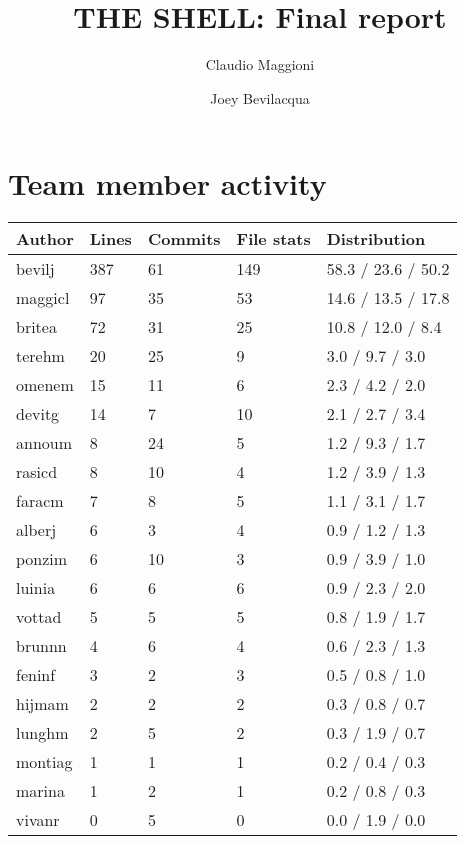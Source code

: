 \documentclass[hidelinks,12pt,a4paper,numbers=enddot]{scrartcl}
\title{THE SHELL: Final report}
\author{Claudio Maggioni \and Joey Bevilacqua}
\begin{document}
\maketitle
\tableofcontents
\newpage

\section{Team member activity}

\begin{table}[h]
\centering
\begin{tabular}{lllll}
\textbf{Author} & \textbf{Lines} & \textbf{Commits} & \textbf{File stats} & \textbf{Distribution} \\ \hline
bevilj  & 387 &   61 &  149 & 58.3 / 23.6 / 50.2  \\
maggicl &  97 &   35 &   53 & 14.6 / 13.5 / 17.8  \\
britea  &  72 &   31 &   25 & 10.8 / 12.0 / 8.4  \\
terehm  &  20 &   25 &    9 &  3.0 / 9.7 / 3.0  \\
omenem  &  15 &   11 &    6 &  2.3 / 4.2 / 2.0  \\
devitg  &  14 &    7 &   10 &  2.1 / 2.7 / 3.4  \\
annoum  &   8 &   24 &    5 &  1.2 / 9.3 / 1.7  \\
rasicd  &   8 &   10 &    4 &  1.2 / 3.9 / 1.3  \\
faracm  &   7 &    8 &    5 &  1.1 / 3.1 / 1.7  \\
alberj  &   6 &    3 &    4 &  0.9 / 1.2 / 1.3  \\
ponzim  &   6 &   10 &    3 &  0.9 / 3.9 / 1.0  \\
luinia  &   6 &    6 &    6 &  0.9 / 2.3 / 2.0  \\
vottad  &   5 &    5 &    5 &  0.8 / 1.9 / 1.7  \\
brunnn  &   4 &    6 &    4 &  0.6 / 2.3 / 1.3  \\
feninf  &   3 &    2 &    3 &  0.5 / 0.8 / 1.0  \\
hijmam  &   2 &    2 &    2 &  0.3 / 0.8 / 0.7  \\
lunghm  &   2 &    5 &    2 &  0.3 / 1.9 / 0.7  \\
montiag &   1 &    1 &    1 &  0.2 / 0.4 / 0.3  \\
marina  &   1 &    2 &    1 &  0.2 / 0.8 / 0.3  \\
vivanr  &   0 &    5 &    0 &  0.0 / 1.9 / 0.0  \\
\end{tabular}
\end{table}
\end{document}
